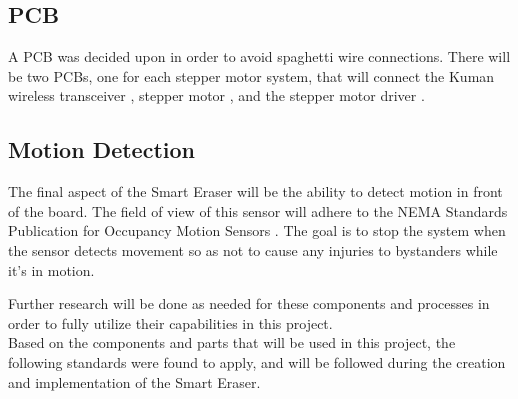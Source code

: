 \subsection{PCB}
A PCB was decided upon in order to avoid spaghetti wire connections. There will be two PCBs, one for each stepper motor system, that will connect the Kuman wireless transceiver \cite{kuman}, stepper motor \cite{smR}, and the stepper motor driver \cite{smdataD}. 

\subsection{Motion Detection}
The final aspect of the Smart Eraser will be the ability to detect motion in front of the board. The field of view of this sensor will adhere to the NEMA Standards Publication for Occupancy Motion Sensors \cite{nema2}. The goal is to stop the system when the sensor detects movement so as not to cause any injuries to bystanders while it's in motion.


Further research will be done as needed for these components and processes in order to fully utilize their capabilities in this project.  \\

Based on the components and parts that will be used in this project, the following standards were found to apply, and will be followed during the creation and implementation of the Smart Eraser.

